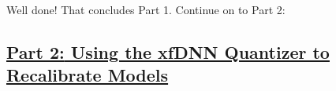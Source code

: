 \documentclass[11pt]{article}
\begin{document}
Well done! That concludes Part 1. Continue on to Part 2:

\subsection{\texorpdfstring{\href{quantizer_caffe.ipynb}{\textbf{Part
2:} Using the xfDNN Quantizer to Recalibrate
Models}}{Part 2: Using the xfDNN Quantizer to Recalibrate Models}}\label{part-2-using-the-xfdnn-quantizer-to-recalibrate-models}


    
    
    
    
\end{document}
